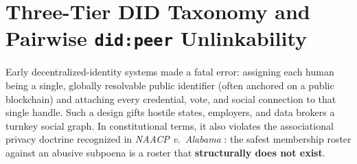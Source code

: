 \begin{table}[htbp]
\centering
\caption{Hardware Key Custody Tiers and Threat Resilience in Layer~5 (\texttt{col-kmsd})}
\label{tab:ch2-custody-tiers}
\small
{}
\end{table}

\section{Three-Tier DID Taxonomy and Pairwise \texttt{did:peer} Unlinkability}
\label{sec:ch2-did-taxonomy}

Early decentralized-identity systems made a fatal error: assigning each human being a single,
globally resolvable public identifier (often anchored on a public blockchain) and attaching
every credential, vote, and social connection to that single handle. Such a design gifts hostile
states, employers, and data brokers a turnkey social graph. In constitutional terms, it also
violates the associational privacy doctrine recognized in \emph{NAACP v.\ Alabama}
\parencite{naacp1958}: the safest membership roster against an abusive subpoena is a roster that
\textbf{structurally does not exist}.

